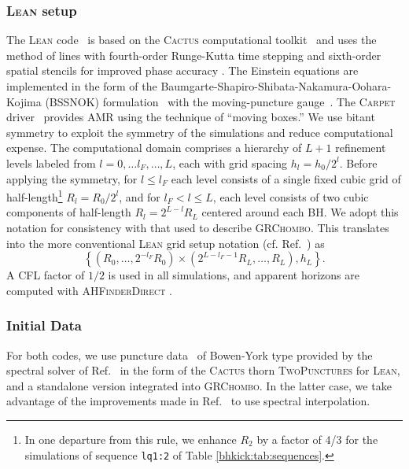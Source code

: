 \subsubsection{\textsc{Lean} setup}
\label{bhkick:sec:lean}
The \textsc{Lean} code~\cite{Sperhake:2006cy} is based on the 
\textsc{Cactus} computational toolkit~\cite{Goodale2002a} and uses 
the method of lines with fourth-order Runge-Kutta time stepping and 
sixth-order spatial stencils for improved phase accuracy 
\cite{Husa:2007hp}. The Einstein equations are implemented in the form 
of the Baumgarte-Shapiro-Shibata-Nakamura-Oohara-Kojima (BSSNOK) 
formulation~\cite{Nakamura:1987zz,Shibata:1995we,Baumgarte:1998te} 
with the moving-puncture gauge~\cite{Campanelli:2005dd,Baker:2005vv}. 
The \textsc{Carpet} driver~\cite{Schnetter:2003rb} provides AMR using 
the technique of ``moving boxes.'' We use bitant symmetry to exploit 
the symmetry of the simulations and reduce computational expense. 
The computational domain 
comprises a hierarchy of $L+1$ refinement levels labeled from 
$l=0,\ldots l_F,\ldots,L$, each with grid spacing $h_l=h_0/2^l$. 
Before applying the symmetry, for $l\leq l_F$ each level consists of 
a single fixed cubic grid of half-length\footnote{In one departure from
this rule, we enhance $R_2$ by a factor of 4/3 for the simulations
of sequence \texttt{lq1:2} of Table \ref{bhkick:tab:sequences}.}
$R_l=R_0/2^l$, and for 
$l_F<l\leq L$, each level consists of two cubic components of 
half-length $R_l=2^{L-l}R_L$ centered around each BH. We adopt this 
notation for consistency with that used to describe \textsc{GRChombo}. 
This translates into the more conventional \textsc{Lean} grid setup 
notation (cf. Ref.~\cite{Sperhake:2006cy}) as
\begin{equation}
    \left\{(R_0,\ldots,2^{-l_F}R_0) \times 
    (2^{L-l_F-1}R_L,\ldots,R_L),h_L\right\}.
\end{equation}
A CFL factor of $1/2$ is used in all simulations, and apparent horizons 
are computed with \textsc{AHFinderDirect}
\cite{Thornburg:1995cp,Thornburg:2003sf}.

\subsubsection{Initial Data}
For both codes, we use puncture data~\cite{Brandt:1997tf} of
Bowen-York \cite{Bowen:1980yu} type provided by the spectral solver of
Ref.~\cite{Ansorg:2004ds} in the form of the \textsc{Cactus} thorn
\textsc{TwoPunctures} for \textsc{Lean}, and a standalone version
integrated into \textsc{GRChombo}.  In the latter case, we take
advantage of the improvements made in Ref.~\cite{Paschalidis:2013oya}
to use spectral interpolation.


